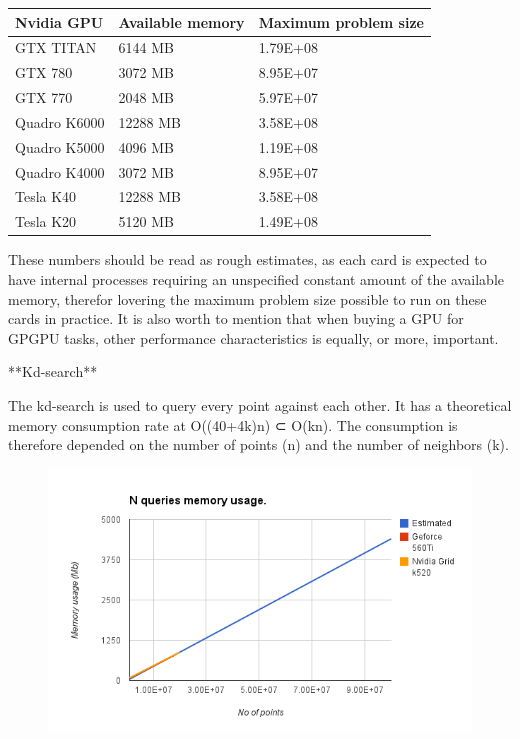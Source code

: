 \begin{enumerate}
\begin{enumerate}
\begin{center}
    \begin{tabular}{ | l | l | p{5cm} |}
    \hline
    Nvidia GPU & Available memory & Maximum problem size \\ \hline
    GTX TITAN & 6144 MB & 1.79E+08 \\ \hline
    GTX 780 & 3072 MB & 8.95E+07 \\ \hline
    GTX 770 & 2048 MB & 5.97E+07 \\ \hline
    Quadro K6000 & 12288 MB & 3.58E+08 \\ \hline
    Quadro K5000 & 4096 MB & 1.19E+08 \\ \hline
    Quadro K4000 & 3072 MB & 8.95E+07 \\ \hline
    Tesla K40 & 12288 MB & 3.58E+08 \\ \hline
    Tesla K20 & 5120 MB & 1.49E+08 \\ \hline
    \end{tabular}
\end{center}

These numbers should be read as rough estimates, as each card is expected to have internal processes requiring an unspecified constant amount of the available memory, therefor lovering the maximum problem size possible to run on these cards in practice. It is also worth to mention that when buying a GPU for GPGPU tasks, other performance characteristics is equally, or more, important. 

**Kd-search**

The kd-search is used to query every point against each other. It has a theoretical memory consumption rate at O((40+4k)n) ⊂ O(kn). The consumption is therefore depended on the number of points (n) and the number of neighbors (k).

\begin{figure}[ht!]
\centering
\includegraphics[width=120mm]{gfx/memory-usage-kd-search.png}


\end{figure}
\end{enumerate}
\end{enumerate}
